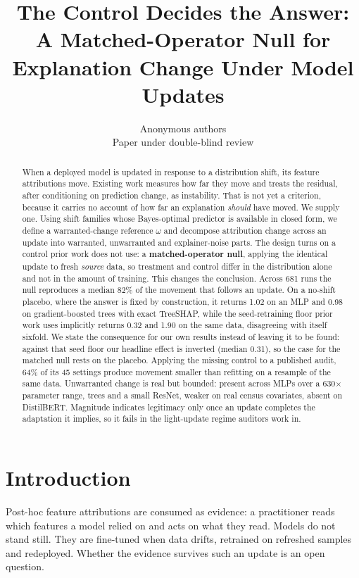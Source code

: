 \documentclass{article}
\title{The Control Decides the Answer: \\ A Matched-Operator Null for Explanation Change
Under Model Updates}
\author{Anonymous authors \\
Paper under double-blind review}
\begin{document}
\maketitle

\begin{abstract}
When a deployed model is updated in response to a distribution shift, its feature attributions move.
Existing work measures how far they move and treats the residual, after conditioning on prediction
change, as instability. That is not yet a criterion, because it carries no account of how far an
explanation \emph{should} have moved. We supply one. Using shift families whose Bayes-optimal
predictor is available in closed form, we define a warranted-change reference $\omega$ and decompose
attribution change across an update into warranted, unwarranted and explainer-noise parts. The design
turns on a control prior work does not use: a \textbf{matched-operator null}, applying the identical
update to fresh \emph{source} data, so treatment and control differ in the distribution alone and not
in the amount of training. This changes the conclusion. Across 681 runs the null reproduces a median
82\% of the movement that follows an update. On a no-shift placebo, where
the answer is fixed by construction, it returns 1.02 on an MLP and 0.98 on gradient-boosted trees
with exact TreeSHAP, while the seed-retraining floor prior work uses implicitly returns 0.32 and
1.90 on the same data, disagreeing with itself sixfold. We state the consequence for our own results
instead of leaving it to be found: against that seed floor our headline effect is inverted (median
0.31), so the case for the matched null rests on the placebo. Applying the missing control to a
published audit, 64\% of its 45 settings produce movement smaller than refitting on a resample of the
same data. Unwarranted change is real but bounded: present across MLPs over a 630$\times$ parameter
range, trees and a small ResNet, weaker on real census covariates, absent on DistilBERT. Magnitude
indicates legitimacy only once an update completes the adaptation it implies, so it fails in the
light-update regime auditors work in.
\end{abstract}

\section{Introduction}

Post-hoc feature attributions are consumed as evidence: a practitioner reads which features a model
relied on and acts on what they read. Models do not stand still. They are fine-tuned when data
drifts, retrained on refreshed samples and redeployed. Whether the evidence survives such an update
is an open question.
\end{document}
